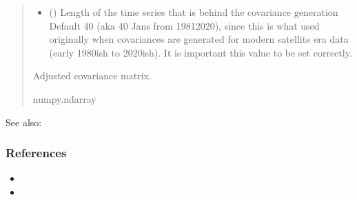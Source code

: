 \documentclass[letterpaper,10pt,english]{sphinxmanual}
\begin{document}
\begin{fulllineitems}
\begin{quote}
\begin{description}
\begin{itemize}
\item {}
\sphinxAtStartPar
{} () \textendash{} Length of the time series that is behind the covariance generation
Default 40 (aka 40 Jans from 1981\sphinxhyphen{}2020), since this is what used
originally when covariances are generated for modern satellite era
data (early 1980\sphinxhyphen{}ish to 2020\sphinxhyphen{}ish). It is important this value to
be set correctly.

\end{itemize}

\sphinxAtStartPar
Adjusted covariance matrix.

\sphinxAtStartPar
numpy.ndarray

\end{description}\end{quote}


\begin{sphinxseealso}{See also:}

\sphinxAtStartPar
{\hyperref[\detokenize{misc:glomar_gridding.covariance_tools.explained_variance_clip}]{}}


\end{sphinxseealso}

\subsubsection*{References}
\begin{itemize}
\item {}
\sphinxAtStartPar
{}

\item {}
\sphinxAtStartPar
{}

\end{itemize}

\end{fulllineitems}

\end{document}
